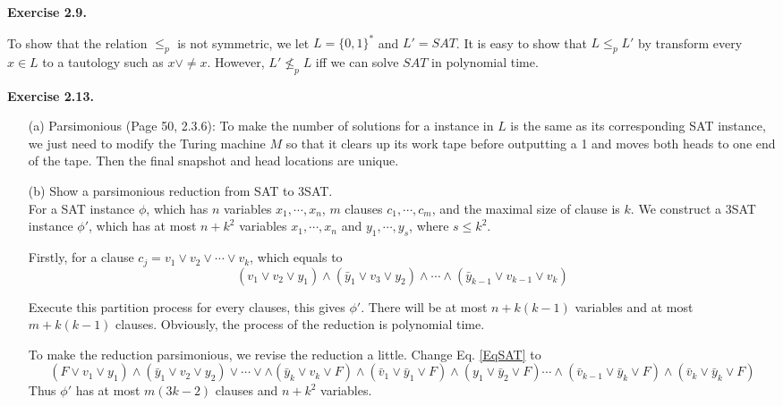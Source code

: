 \documentclass[a4paper]{article}
\newenvironment{exercise}[1]{
	\par
	\noindent\textbf{Exercise #1.}\quad
}{
	\par
	\bigskip
}
\begin{document}
	\begin{exercise}{2.9}
		To show that the relation $\leq_p$ is not symmetric, we let $L=\{0,1\}^*$ and $L'=SAT$. It is easy to show that $L\leq_p L'$ by transform every $x\in L$ to a tautology such as $x\vee \neq x$. However, $L'\not\leq_p L$ iff we can solve $SAT$ in polynomial time.
	\end{exercise}
	
    \begin{exercise}{2.13}
	\begin{itemize}
\item [(a)]
Parsimonious (Page 50, 2.3.6): 
To make the number of solutions for a instance in $L$ is the same as its corresponding SAT instance, we just need to modify the Turing machine $M$ so that it clears up its work tape before outputting a 1 and moves both heads to one end of the tape. Then the final snapshot and head locations are unique. 
\item[(b)]Show a parsimonious reduction from SAT to 3SAT.\\
For a SAT instance $\phi$, which has $n$ variables $x_{1}, \cdots, x_{n}$, $m$ clauses $c_{1},\cdots, c_{m}$, and the maximal size of clause is $k$. We construct a 3SAT instance $\phi'$, which has at most $n + k^{2}$ variables $x_{1},\cdots, x_{n}$ and $y_{1},\cdots , y_{s}$, where $s\leq k^{2}$.

Firstly, for a clause $c_{j} = v_{1} \vee v_{2} \vee \cdots \vee v_{k}$, which equals to 
\begin{equation}(v_{1} \vee v_{2} \vee y_{1} )\wedge (\bar{y}_{1} \vee v_{3} \vee y_{2})
\wedge \cdots \wedge(\bar{y}_{k-1}\vee v_{k - 1} \vee v_{k})
\label{EqSAT}\end{equation}

Execute this partition process for every clauses, this gives $\phi'$. There will be at most  $n + k(k - 1)$ variables and at most $m + k(k - 1)$ clauses. Obviously, the process of the reduction is polynomial time.

To make the reduction parsimonious, we revise the reduction a little.
Change Eq. \ref{EqSAT} to
\begin{equation}
(F \vee v_{1} \vee y_{1} )\wedge (\bar{y}_{1} \vee v_{2} \vee y_{2})\vee \cdots \vee
\wedge (\bar{y}_{k}\vee v_{k} \vee F) \wedge (\bar{v}_{1} \vee \bar{y}_{1} \vee F) \wedge ( y_{1} \vee \bar{y}_{2}\vee F) \cdots \wedge (\bar{v}_{k-1} \vee \bar{y}_{k} \vee F)\wedge 
(  \bar{v}_{k}\vee \bar{y}_{k}\vee F)
\label{EqSAT1}\end{equation}
Thus $\phi'$ has at most $m(3k - 2)$ clauses and $n + k^{2}$ variables.


\end{itemize}
\end{exercise}
\end{document}
